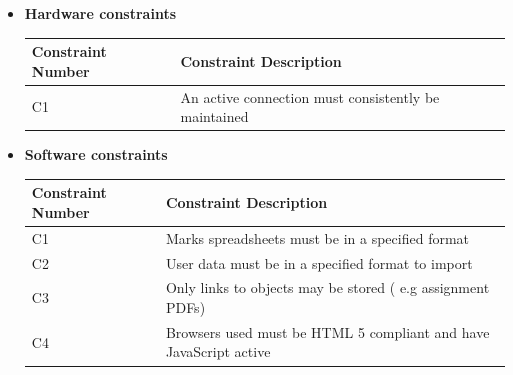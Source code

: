 \documentclass[a4paper,12pt]{article}
\begin{document}
        \begin{itemize}
       		\item \textbf{Hardware constraints}
        	\begin{center}
        		
        		\begin{tabularx}{\textwidth}{ |X|X| }
        			
        			\hline
        			Constraint Number & Constraint Description \\
        			\hline
        			C1 & An active connection must consistently be maintained \\
        			\hline
        			
        		\end{tabularx}
        	\end{center}
        	\item \textbf{Software constraints}
               \begin{center}
               	
		        	\begin{tabularx}{\textwidth}{ |X|X| }
		        		 
		        		\hline
		        		Constraint Number & Constraint Description \\
		        		\hline
		        		C1 & Marks spreadsheets must be in a specified format \\
		        		\hline
		        		C2 & User data must be in a specified format to import  \\
		        		\hline
		        		C3 & Only links to objects may be stored ( e.g assignment PDFs) \\
		        		\hline
		        		C4 & Browsers used must be HTML 5 compliant and have JavaScript active \\
		        		\hline
		        		
		        	\end{tabularx}
        		\end{center}
        \end{itemize}
    
    	\pagebreak
    	
\end{document}
